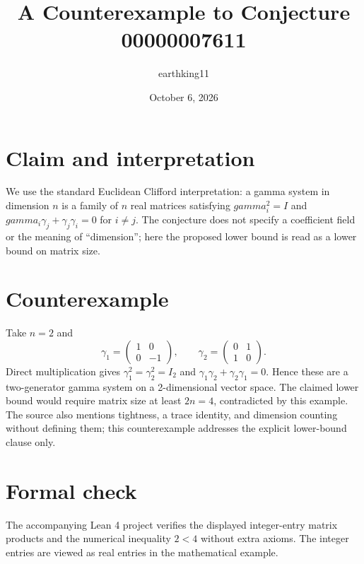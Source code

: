 \documentclass[11pt]{article}
\title{A Counterexample to Conjecture 00000007611}
\author{earthking11}
\date{October 6, 2026}
\begin{document}
\maketitle
\section*{Claim and interpretation}
We use the standard Euclidean Clifford interpretation: a gamma system in dimension $n$ is a family of $n$ real matrices satisfying $gamma_i^2=I$ and $gamma_i\gamma_j+\gamma_j\gamma_i=0$ for $i\ne j$. The conjecture does not specify a coefficient field or the meaning of ``dimension''; here the proposed lower bound is read as a lower bound on matrix size.
\section*{Counterexample}
Take $n=2$ and
\[
\gamma_1=\begin{pmatrix}1&0\\0&-1\end{pmatrix},\qquad
\gamma_2=\begin{pmatrix}0&1\\1&0\end{pmatrix}.
\]
Direct multiplication gives $\gamma_1^2=\gamma_2^2=I_2$ and $\gamma_1\gamma_2+\gamma_2\gamma_1=0$. Hence these are a two-generator gamma system on a 2-dimensional vector space. The claimed lower bound would require matrix size at least $2n=4$, contradicted by this example. The source also mentions tightness, a trace identity, and dimension counting without defining them; this counterexample addresses the explicit lower-bound clause only.
\section*{Formal check}
The accompanying Lean 4 project verifies the displayed integer-entry matrix products and the numerical inequality $2<4$ without extra axioms. The integer entries are viewed as real entries in the mathematical example.
\end{document}
